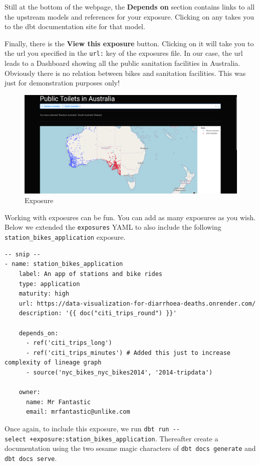 \documentclass[
]{book}
\begin{document}
Still at the bottom of the webpage, the \textbf{Depends on} section contains links to all the upstream models and references for your exposure. Clicking on any takes you to the dbt documentation site for that model.

Finally, there is the \textbf{View this exposure} button. Clicking on it will take you to the url you specified in the \texttt{url:} key of the exposures file. In our case, the url leads to a Dashboard showing all the public sanitation facilities in Australia. Obviously there is no relation between bikes and sanitation facilities. This was just for demonstration purposes only!

\begin{figure}
\centering
\includegraphics{./images/exposure_hyperlink.png}
\caption{Exposure}
\end{figure}

Working with exposures can be fun. You can add as many exposures as you wish. Below we extended the \texttt{exposures} YAML to also include the following \texttt{station\_bikes\_application} exposure.

\begin{verbatim}
-- snip --
- name: station_bikes_application
    label: An app of stations and bike rides
    type: application
    maturity: high
    url: https://data-visualization-for-diarrhoea-deaths.onrender.com/
    description: '{{ doc("citi_trips_round") }}'

    depends_on:
      - ref('citi_trips_long')
      - ref('citi_trips_minutes') # Added this just to increase complexity of lineage graph
      - source('nyc_bikes_nyc_bikes2014', '2014-tripdata')

    owner:
      name: Mr Fantastic
      email: mrfantastic@unlike.com
\end{verbatim}

Once again, to include this exposure, we run \texttt{dbt\ run\ -\/-select\ +exposure:station\_bikes\_application}. Thereafter create a documentation using the two sesame magic characters of \texttt{dbt\ docs\ generate} and \texttt{dbt\ docs\ serve}.
\end{document}
